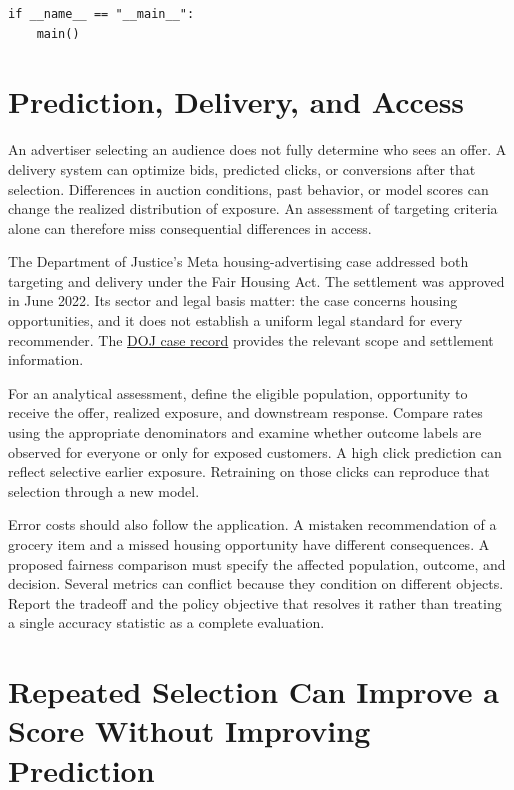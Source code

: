 \begin{Verbatim}[breaklines,breakanywhere,fontsize=\small]
if __name__ == "__main__":
    main()
\end{Verbatim}

\hypertarget{M07-prediction-delivery-and-access}{%
\section{Prediction, Delivery, and
Access}\label{M07-prediction-delivery-and-access}}

\noindent \noindent An advertiser selecting an audience does not fully determine
who sees an offer. A delivery system can optimize bids, predicted
clicks, or conversions after that selection. Differences in auction
conditions, past behavior, or model scores can change the realized
distribution of exposure. An assessment of targeting criteria alone can
therefore miss consequential differences in access.

The Department of Justice's Meta housing-advertising case addressed both
targeting and delivery under the Fair Housing Act. The settlement was
approved in June 2022. Its sector and legal basis matter: the case
concerns housing opportunities, and it does not establish a uniform
legal standard for every recommender. The
\href{https://www.justice.gov/crt/case/united-states-v-meta-platforms-inc-fka-facebook-inc-sdny}{DOJ
case record} provides the relevant scope and settlement information.

For an analytical assessment, define the eligible population,
opportunity to receive the offer, realized exposure, and downstream
response. Compare rates using the appropriate denominators and examine
whether outcome labels are observed for everyone or only for exposed
customers. A high click prediction can reflect selective earlier
exposure. Retraining on those clicks can reproduce that selection
through a new model.

Error costs should also follow the application. A mistaken
recommendation of a grocery item and a missed housing opportunity have
different consequences. A proposed fairness comparison must specify the
affected population, outcome, and decision. Several metrics can conflict
because they condition on different objects. Report the tradeoff and the
policy objective that resolves it rather than treating a single accuracy
statistic as a complete evaluation.

\hypertarget{M07-repeated-selection-can-improve-a-score-without-improving-prediction}{%
\section{Repeated Selection Can Improve a Score Without Improving
Prediction}\label{M07-repeated-selection-can-improve-a-score-without-improving-prediction}}

